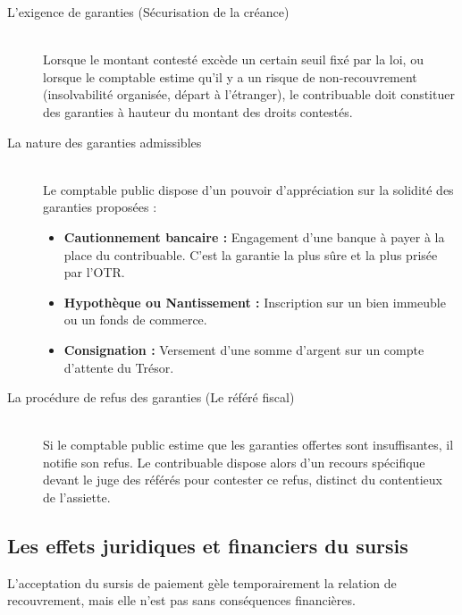 \documentclass[Cours_contentieuxTF2026.tex]{subfiles}
\begin{document}
\begin{description}
	\item[L'exigence de garanties (Sécurisation de la créance)] \hfill \\
	Lorsque le montant contesté excède un certain seuil fixé par la loi, ou lorsque le comptable estime qu'il y a un risque de non-recouvrement (insolvabilité organisée, départ à l'étranger), le contribuable doit constituer des garanties à hauteur du montant des droits contestés.
	
	\item[La nature des garanties admissibles] \hfill \\
	Le comptable public dispose d'un pouvoir d'appréciation sur la solidité des garanties proposées :
	\begin{itemize}
		\item \textbf{Cautionnement bancaire :} Engagement d'une banque à payer à la place du contribuable. C'est la garantie la plus sûre et la plus prisée par l'OTR.
		\item \textbf{Hypothèque ou Nantissement :} Inscription sur un bien immeuble ou un fonds de commerce.
		\item \textbf{Consignation :} Versement d'une somme d'argent sur un compte d'attente du Trésor.
	\end{itemize}
	
	\item[La procédure de refus des garanties (Le référé fiscal)] \hfill \\
	Si le comptable public estime que les garanties offertes sont insuffisantes, il notifie son refus. Le contribuable dispose alors d'un recours spécifique devant le juge des référés pour contester ce refus, distinct du contentieux de l'assiette.
\end{description}

\subsection{Les effets juridiques et financiers du sursis}

L'acceptation du sursis de paiement gèle temporairement la relation de recouvrement, mais elle n'est pas sans conséquences financières.
\end{document}
